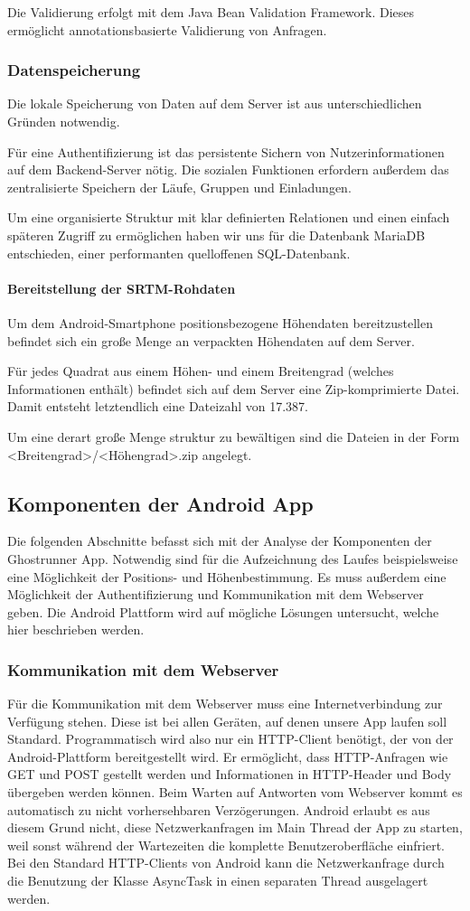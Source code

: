 Die Validierung erfolgt mit dem Java Bean Validation Framework. Dieses ermöglicht annotationsbasierte Validierung von Anfragen.
\subsubsection{Datenspeicherung}
Die lokale Speicherung von Daten auf dem Server ist aus unterschiedlichen Gründen notwendig.

Für eine Authentifizierung ist das persistente Sichern von Nutzerinformationen auf dem Backend-Server nötig. Die sozialen Funktionen erfordern außerdem das zentralisierte Speichern der Läufe, Gruppen und Einladungen.

Um eine organisierte Struktur mit klar definierten Relationen und einen einfach späteren Zugriff zu ermöglichen haben wir uns für die Datenbank MariaDB entschieden, einer performanten quelloffenen SQL-Datenbank.
\paragraph{Bereitstellung der SRTM-Rohdaten}
Um dem Android-Smartphone positionsbezogene Höhendaten bereitzustellen befindet sich ein große Menge an verpackten Höhendaten auf dem Server.

Für jedes Quadrat aus einem Höhen- und einem Breitengrad (welches Informationen enthält) befindet sich auf dem Server eine Zip-komprimierte Datei. Damit entsteht letztendlich eine Dateizahl von 17.387.

Um eine derart große Menge struktur zu bewältigen sind die Dateien in der Form <Breitengrad>/<Höhengrad>.zip angelegt.
\subsection{Komponenten der Android App}
Die folgenden Abschnitte befasst sich mit der Analyse der Komponenten der Ghostrunner App. Notwendig sind für die Aufzeichnung des Laufes beispielsweise eine Möglichkeit der Positions- und Höhenbestimmung. Es muss außerdem eine Möglichkeit der Authentifizierung und Kommunikation mit dem Webserver geben. Die Android Plattform wird auf mögliche Lösungen untersucht, welche hier beschrieben werden.
\subsubsection{Kommunikation mit dem Webserver}
Für die Kommunikation mit dem Webserver muss eine Internetverbindung zur Verfügung stehen. Diese ist bei allen Geräten, auf denen unsere App laufen soll Standard. Programmatisch wird also nur ein HTTP-Client benötigt, der von der Android-Plattform bereitgestellt wird. Er ermöglicht, dass  HTTP-Anfragen wie GET und POST gestellt werden und Informationen in HTTP-Header und Body übergeben werden können. Beim Warten auf Antworten vom Webserver kommt es automatisch zu nicht vorhersehbaren Verzögerungen. Android erlaubt es aus diesem Grund nicht, diese Netzwerkanfragen im Main Thread der App zu starten, weil sonst während der Wartezeiten die komplette Benutzeroberfläche einfriert. Bei den Standard HTTP-Clients von Android kann die Netzwerkanfrage durch die Benutzung der Klasse AsyncTask in einen separaten Thread ausgelagert werden. \cite{androidnetwork}

